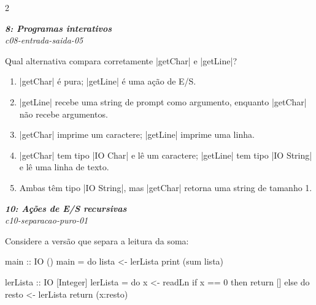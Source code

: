 \documentclass[a4paper,10pt,brazil]{article}
\begin{document}
\begin{multicols}{2}
\begin{enumerate}
\end{enumerate}

\begin{flushright}
  \footnotesize
  \textit{\textbf{8: Programas interativos}}\\
  \textit{c08-entrada-saida-05}\\

\end{flushright}
Qual alternativa compara corretamente \haskellinline|getChar| e \haskellinline|getLine|?

\begin{enumerate}
  \item \haskellinline|getChar| é pura; \haskellinline|getLine| é uma ação de E/S.

  \item \haskellinline|getLine| recebe uma string de prompt como argumento, enquanto \haskellinline|getChar| não recebe argumentos.

  \item \haskellinline|getChar| imprime um caractere; \haskellinline|getLine| imprime uma linha.

  \item \haskellinline|getChar| tem tipo \haskellinline|IO Char| e lê um caractere; \haskellinline|getLine| tem tipo \haskellinline|IO String| e lê uma linha de texto.

  \item Ambas têm tipo \haskellinline|IO String|, mas \haskellinline|getChar| retorna uma string de tamanho 1.


\end{enumerate}

\begin{flushright}
  \footnotesize
  \textit{\textbf{10: Ações de E/S recursivas}}\\
  \textit{c10-separacao-puro-01}\\

\end{flushright}
Considere a versão que separa a leitura da soma:

\begin{haskellcode}
main :: IO ()
main = do
  lista <- lerLista
  print (sum lista)

lerLista :: IO [Integer]
lerLista = do
  x <- readLn
  if x == 0
    then return []
    else do
      resto <- lerLista
      return (x:resto)
\end{haskellcode}


\end{multicols}
\end{document}
